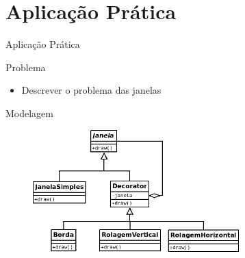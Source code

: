 \section{Aplicação Prática}

\begin{frame}{Aplicação Prática}{}
\begin{block}{Problema}
  \begin{itemize}
    \item<1-> Descrever o problema das janelas
  \end{itemize}
\end{block}
\end{frame}

\begin{frame}{Modelagem}
\begin{block}{}
  \begin{figure}
    \includegraphics[width=8cm]{figuras/janela}
  \end{figure}
\end{block}
\end{frame}
